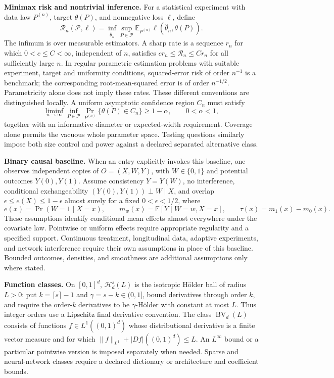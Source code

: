 \documentclass[11pt,a4paper]{article}
\newcommand{\E}{\mathbb E}
\begin{document}
\textbf{Minimax risk and nontrivial inference.}
For a statistical experiment with data law $P^{(n)}$, target $\theta(P)$,
and nonnegative loss $\ell$, define
\[
 \mathcal R_n(\mathcal P,\ell)
   =\inf_{\widehat\theta_n}\sup_{P\in\mathcal P}
      \E_{P^{(n)}}\ell(\widehat\theta_n,\theta(P)).
\]
The infimum is over measurable estimators. A sharp rate is a sequence
$r_n$ for which $0<c\leq C<\infty$, independent of $n$, satisfies
$c r_n\leq\mathcal R_n\leq C r_n$ for all sufficiently large $n$.
In regular parametric estimation problems with suitable experiment, target
and uniformity conditions, squared-error risk of order $n^{-1}$ is a
benchmark; the corresponding root-mean-squared error is of order
$n^{-1/2}$. Parametricity alone does not imply these rates. These different
conventions are distinguished locally. A uniform asymptotic confidence region $C_n$
must satisfy
\[
 \liminf_{n\to\infty}\inf_{P\in\mathcal P}
     \Pr_{P^{(n)}}\{\theta(P)\in C_n\}\geq 1-\alpha,
 \qquad 0<\alpha<1,
\]
together with an informative diameter or expected-width requirement.
Coverage alone permits the vacuous whole parameter space. Testing questions
similarly impose both size control and power against a declared separated
alternative class.

\textbf{Binary causal baseline.}
When an entry explicitly invokes this baseline, one observes independent
copies of $O=(X,W,Y)$, with $W\in\{0,1\}$ and potential outcomes $Y(0),Y(1)$.
Assume consistency $Y=Y(W)$, no interference, conditional exchangeability
$(Y(0),Y(1))\perp W\mid X$, and overlap
$\epsilon\leq e(X)\leq1-\epsilon$ almost surely for a fixed
$0<\epsilon<1/2$, where
\[
 e(x)=\Pr(W=1\mid X=x),\qquad
 m_w(x)=\E[Y\mid W=w,X=x],\qquad
 \tau(x)=m_1(x)-m_0(x).
\]
These assumptions identify conditional mean effects almost everywhere
under the covariate law. Pointwise or uniform effects require appropriate
regularity and a specified support. Continuous treatment, longitudinal
data, adaptive experiments, and network interference require their own
assumptions in place of this baseline. Bounded outcomes, densities, and
smoothness are additional assumptions only where stated.

\textbf{Function classes.}
On $[0,1]^d$, $\mathcal H_d^s(L)$ is the isotropic Hölder ball of radius
$L>0$: put $k=\lceil s\rceil-1$ and $\gamma=s-k\in(0,1]$, bound derivatives
through order $k$, and require the order-$k$ derivatives to be
$\gamma$-Hölder with constant at most $L$. Thus integer orders use a
Lipschitz final derivative convention. The class
$\operatorname{BV}_d(L)$ consists of functions $f\in L^1((0,1)^d)$ whose
distributional derivative is a finite vector measure and for which
$\|f\|_{L^1}+|Df|((0,1)^d)\leq L$.
An $L^\infty$ bound or a particular pointwise version is imposed separately
when needed. Sparse and neural-network classes require a declared
dictionary or architecture and coefficient bounds.
\end{document}
